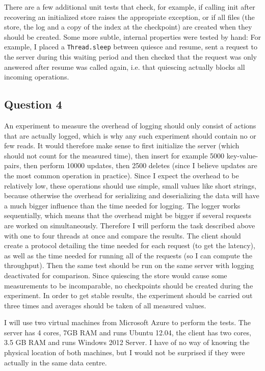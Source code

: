 \documentclass[12pt,a4paper]{article}
\begin{document}
There are a few additional unit tests that check, for example, if calling init after recovering an initialized store raises the appropriate exception, or if all files (the store, the log and a copy of the index at the checkpoint) are created when they should be created. Some more subtle, internal properties were tested by hand: For example, I placed a \texttt{Thread.sleep} between quiesce and resume, sent a request to the server during this waiting period and then checked that the request was only answered after resume was called again, i.e. that quiescing actually blocks all incoming operations.

\subsection*{Question 4}
\label{sec:pq4}

An experiment to measure the overhead of logging should only consist of actions that are actually logged, which is why any such experiment should contain no or few reads. It would therefore make sense to first initialize the server (which should not count for the measured time), then insert for example 5000 key-value-pairs, then perform 10000 updates, then 2500 deletes (since I believe updates are the most common operation in practice). Since I expect the overhead to be relatively low, these operations should use simple, small values like short strings, because otherwise the overhead for serializing and deserializing the data will have a much bigger influence than the time needed for logging. The logger works sequentially, which means that the overhead might be bigger if several requests are worked on simultaneously. Therefore I will perform the task described above with one to four threads at once and compare the results. The client should create a protocol detailing the time needed for each request (to get the latency), as well as the time needed for running all of the requests (so I can compute the throughput). Then the same test should be run on the same server with logging deactivated for comparison. Since quiescing the store would cause some measurements to be incomparable, no checkpoints should be created during the experiment. In order to get stable results, the experiment should be carried out three times and averages should be taken of all measured values.

I will use two virtual machines from Microsoft Azure to perform the tests. The server has 4 cores, 7GB RAM and runs Ubuntu 12.04, the client has two cores, 3.5 GB RAM and runs Windows 2012 Server. I have of no way of knowing the physical location of both machines, but I would not be surprised if they were actually in the same data centre.
\end{document}
